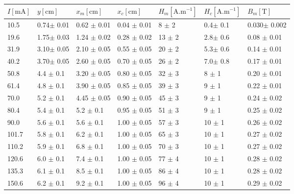 \documentclass{article}
\begin{document}
\begin{center}
    \label{tab:title} 
    \begin{tabular}[h!]{| l | l | l | l | l | l | l |}
    \hline
    $I [\mathrm{mA}]$ & $y [\mathrm{cm}]$ & $x_m [\mathrm{cm}]$ & $x_c [\mathrm{cm}]$ & $H_m [\mathrm{A.m^{-1}}]$ & $H_c [\mathrm{A.m^{-1}}]$ & $B_m [\mathrm{T}]$ \\ \hline \hline
    10.5  & 0.74$\pm$ 0.01& 0.62 $\pm$ 0.01& 0.04 $\pm$ 0.01 & 8  $\pm$ 2   & 0.4$\pm$ 0.1 & 0.030$\pm$ 0.002\\\hline
    19.6  & 1.75$\pm$ 0.03& 1.24 $\pm$ 0.02& 0.28 $\pm$ 0.02 & 13 $\pm$ 2   & 2.8$\pm$ 0.6 & 0.08 $\pm$ 0.01 \\ \hline
    31.9  & 3.10$\pm$ 0.05& 2.10 $\pm$ 0.05& 0.55 $\pm$ 0.05 & 20 $\pm$ 2   & 5.3$\pm$ 0.6 & 0.14 $\pm$ 0.01 \\ \hline
    40.2  & 3.70$\pm$ 0.05& 2.60 $\pm$ 0.05& 0.70 $\pm$ 0.05 & 26 $\pm$ 2   & 7.0$\pm$ 0.8 & 0.17 $\pm$ 0.01 \\ \hline
    50.8  & 4.4 $\pm$ 0.1 & 3.20 $\pm$ 0.05& 0.80 $\pm$ 0.05 & 32 $\pm$ 3   & 8  $\pm$ 1   & 0.20 $\pm$ 0.01 \\ \hline
    61.4  & 4.8 $\pm$ 0.1 & 3.90 $\pm$ 0.05& 0.85 $\pm$ 0.05 & 39 $\pm$ 3   & 9  $\pm$ 1   & 0.22 $\pm$ 0.01 \\ \hline
    70.0  & 5.2 $\pm$ 0.1 & 4.45 $\pm$ 0.05& 0.90 $\pm$ 0.05 & 45   $\pm$ 3   & 9  $\pm$ 1   & 0.24 $\pm$ 0.02 \\ \hline
    80.4  & 5.4 $\pm$ 0.1 & 5.2  $\pm$ 0.1 & 0.95 $\pm$ 0.05 & 51   $\pm$ 3   & 9  $\pm$ 1   & 0.25 $\pm$ 0.02 \\ \hline
    90.0  & 5.6 $\pm$ 0.1 & 5.6  $\pm$ 0.1 & 1.00 $\pm$ 0.05 & 57   $\pm$ 3   & 10 $\pm$ 1   & 0.26 $\pm$ 0.02 \\ \hline
    101.7 & 5.8 $\pm$ 0.1 & 6.2  $\pm$ 0.1 & 1.00 $\pm$ 0.05 & 65   $\pm$ 3   & 10 $\pm$ 1   & 0.27 $\pm$ 0.02 \\ \hline
    110.2 & 5.9 $\pm$ 0.1 & 6.8  $\pm$ 0.1 & 1.00 $\pm$ 0.05 & 70   $\pm$ 3   & 10 $\pm$ 1   & 0.27 $\pm$ 0.02 \\ \hline
    120.6 & 6.0 $\pm$ 0.1 & 7.4  $\pm$ 0.1 & 1.00 $\pm$ 0.05 & 77   $\pm$ 4   & 10 $\pm$ 1   & 0.28 $\pm$ 0.02 \\ \hline
    135.3 & 6.1 $\pm$ 0.1 & 8.5  $\pm$ 0.1 & 1.00 $\pm$ 0.05 & 86   $\pm$ 4   & 10 $\pm$ 1   & 0.28 $\pm$ 0.02 \\ \hline
    150.6 & 6.2 $\pm$ 0.1 & 9.2  $\pm$ 0.1 & 1.00 $\pm$ 0.05 & 96   $\pm$ 4   & 10 $\pm$ 1   & 0.29 $\pm$ 0.02 \\ \hline
    \end{tabular}
\end{center}
\end{document}
